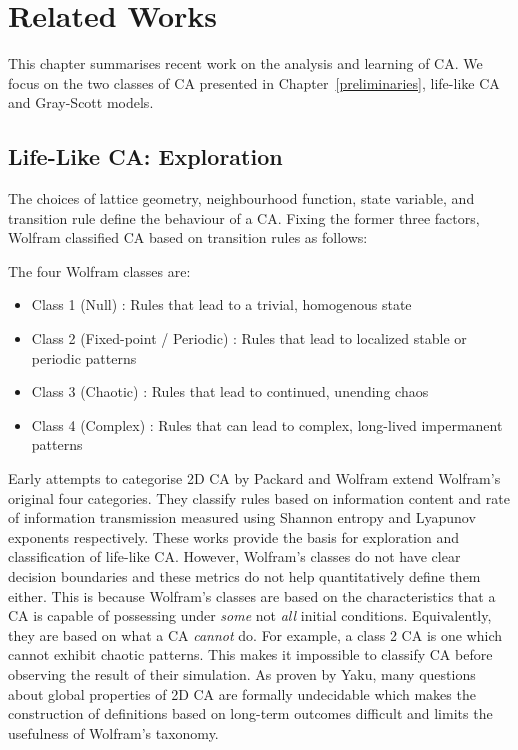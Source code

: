 \chapter{Related Works}

This chapter summarises recent work on the analysis and learning of CA. We focus on the two classes of CA presented in Chapter~\ref{preliminaries}, life-like CA and Gray-Scott models.

\section{Life-Like CA: Exploration} \label{sec: life-like-exploration}

The choices of lattice geometry, neighbourhood function, state variable, and transition rule define the behaviour of a CA. Fixing the former three factors, Wolfram\cite{wolfram1986theory} classified CA based on transition rules as follows:
\begin{definition}\label{def:wolfram-classes} The four Wolfram classes are:
\begin{itemize}
  \item Class 1 (Null) : Rules that lead to a trivial, homogenous state
  \item Class 2 (Fixed-point / Periodic) : Rules that lead to localized stable or periodic patterns
  \item Class 3 (Chaotic) : Rules that lead to continued, unending chaos
  \item Class 4 (Complex) : Rules that can lead to complex, long-lived impermanent patterns
\end{itemize}
\end{definition}

Early attempts to categorise 2D CA by Packard and Wolfram\cite{packard1985two} extend Wolfram's original four categories. They classify rules based on information content and rate of information transmission measured using Shannon entropy and Lyapunov exponents respectively. These works provide the basis for exploration and classification of life-like CA. However, Wolfram's classes do not have clear decision boundaries and these metrics do not help quantitatively define them either. This is because Wolfram's classes are based on the characteristics that a CA is capable of possessing under \textit{some} not \textit{all} initial conditions. Equivalently, they are based on what a CA \textit{cannot} do.  For example, a class 2 CA is one which cannot exhibit chaotic patterns. This makes it impossible to classify CA before observing the result of their simulation. As proven by Yaku\cite{yaku1973constructibility}, many questions about global properties of 2D CA are formally undecidable which makes the construction of definitions based on long-term outcomes difficult and limits the usefulness of Wolfram's taxonomy.

